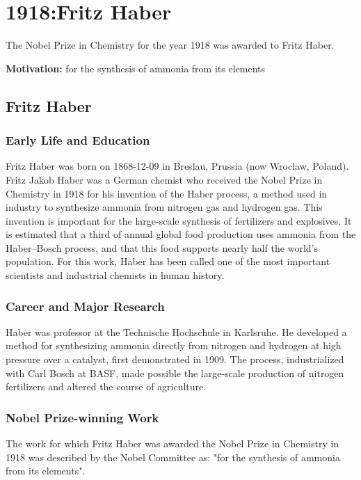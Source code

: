 \chapter{1918:Fritz Haber}
\label{chap:chemistry1918}

The Nobel Prize in Chemistry for the year 1918 was awarded to Fritz Haber.

\textbf{Motivation:}
for the synthesis of ammonia from its elements

\section{Fritz Haber}

\subsection*{Early Life and Education}

Fritz Haber was born on 1868-12-09 in Breslau, Prussia (now Wroclaw, Poland).
Fritz Jakob Haber was a German chemist who received the Nobel Prize in Chemistry in 1918 for his invention of the Haber process, a method used in industry to synthesize ammonia from nitrogen gas and hydrogen gas. This invention is important for the large-scale synthesis of fertilizers and explosives. It is estimated that a third of annual global food production uses ammonia from the Haber–Bosch process, and that this food supports nearly half the world's population. For this work, Haber has been called one of the most important scientists and industrial chemists in human history.

\subsection*{Career and Major Research}

Haber was professor at the Technische Hochschule in Karlsruhe. He developed a method for synthesizing ammonia directly from nitrogen and hydrogen at high pressure over a catalyst, first demonstrated in 1909. The process, industrialized with Carl Bosch at BASF, made possible the large-scale production of nitrogen fertilizers and altered the course of agriculture.

\subsection*{Nobel Prize-winning Work}

The work for which Fritz Haber was awarded the Nobel Prize in Chemistry in 1918 was described by the Nobel Committee as: "for the synthesis of ammonia from its elements".

